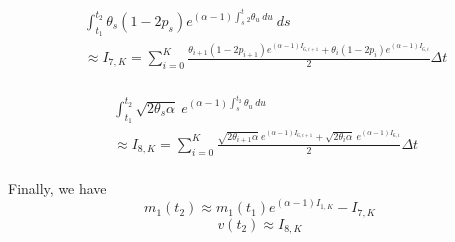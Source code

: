 \documentclass[a4paper, 12pt]{article}
\begin{document}
\begin{itemize}
\begin{itemize}
\begin{equation*}
	\begin{split}
	& \int_{t_1}^{t_2} \theta_s (1-2p_s) e^{(\alpha-1)\int_s^t_2 \theta_u \ du } \ ds \\
	& \approx I_{7,K}= \sum_{i=0}^K \frac{    \theta_{i+1} (1-2p_{i+1}) e^{(\alpha-1)I_{6,i+1} }    +    \theta_{i} (1-2p_{i}) e^{(\alpha-1)I_{6,i} }      }{2}\Delta t \\
	\end{split}
\end{equation*}

\begin{equation*}
	\begin{split}
	& \int_{t_1}^{t_2} \sqrt{2 \theta_s \alpha} \ e^{(\alpha-1)\int_s^{t_2} \theta_u \ du } \\
	& \approx I_{8,K}= \sum_{i=0}^K \frac{     \sqrt{2 \theta_{i+1} \alpha} \ e^{(\alpha-1)I_{6,i+1} }    +     \sqrt{2 \theta_{i} \alpha} \ e^{(\alpha-1)I_{6,i} }      }{2}\Delta t \\
	\end{split}
\end{equation*}

Finally, we have
		\begin{equation}
			m_{1}(t_2)  \approx m_1(t_1) e^{(\alpha-1)I_{1,K}} - I_{7,K}
	\end{equation}
	\begin{equation}
		v(t_2)  \approx I_{8,K}
\end{equation}


\end{itemize}


\end{itemize}
\end{document}
